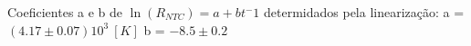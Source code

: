 
Coeficientes a e b de $\ln(R_{NTC}) = a + b t^-1$ determidados pela linearização:
a = $(4.17 \pm 0.07)10^3\ [K]$
b = $-8.5 \pm 0.2$
